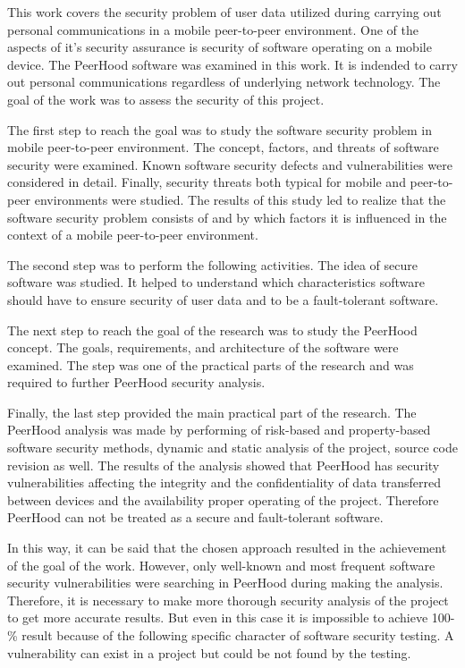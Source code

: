 %
%
This work covers the security problem of user data utilized during carrying out personal communications in a mobile peer-to-peer environment. 
%
One of the aspects of it's security assurance is security of software operating on a mobile device. 
%
The PeerHood software was examined in this work. 
%
It is indended to carry out personal communications regardless of underlying network technology. 
%
The goal of the work was to assess the security of this project. 

%
The first step to reach the goal was to study the software security problem in mobile peer-to-peer environment. 
%
The concept, factors, and threats of software security were examined. 
%
Known software security defects and vulnerabilities were considered in detail. 
%
Finally, security threats both typical for mobile and peer-to-peer environments were studied. 
%
The results of this study led to realize that the software security problem consists of and by which factors it is influenced in the context of a mobile peer-to-peer environment. 

%
The second step was to perform the following activities. 
%
The idea of secure software was studied. 
%
It helped to understand which characteristics software should have to ensure security of user data and to be a fault-tolerant software. 

%
The next step to reach the goal of the research was to study the PeerHood concept. 
%
The goals, requirements, and architecture of the software were examined. 
%
The step was one of the practical parts of the research and was required to further PeerHood security analysis. 

%
Finally, the last step provided the main practical part of the research. 
%
The PeerHood analysis was made by performing of risk-based and property-based software security methods, dynamic and static analysis of the project, source code revision as well. 
%
The results of the analysis showed that PeerHood has security vulnerabilities affecting the integrity and the confidentiality of data transferred between devices and the availability proper operating of the project. 
%
Therefore PeerHood can not be treated as a secure and fault-tolerant software. 

%
In this way, it can be said that the chosen approach resulted in the achievement of the goal of the work. 
%
However, only well-known and most frequent software security vulnerabilities were searching in PeerHood during making the analysis. 
%
Therefore, it is necessary to make more thorough security analysis of the project to get more accurate results. 
%
But even in this case it is impossible to achieve 100-\% result because of the following specific character of software security testing. 
%
A vulnerability can exist in a project but could be not found by the testing. 


